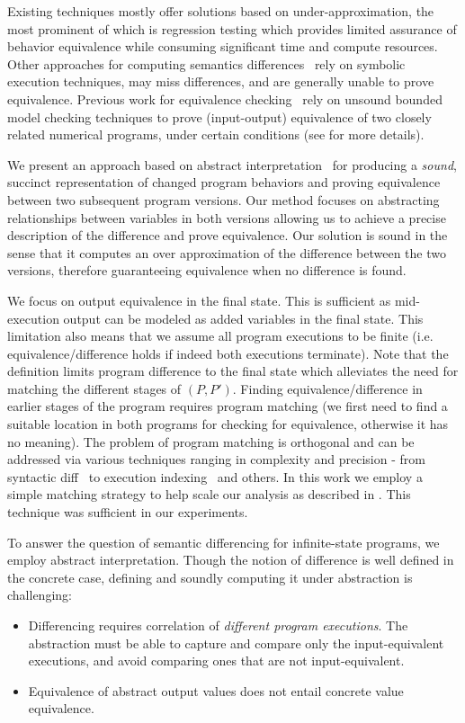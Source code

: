 Existing techniques mostly offer solutions based on  under-approximation, the most prominent of which is regression testing which provides limited assurance of behavior equivalence while consuming significant time and compute resources. 
Other approaches for computing semantics differences~\cite{DwyerElbaumPerson08,EnglerRamos11} rely on symbolic execution techniques, may miss differences, and are generally unable to prove equivalence. Previous work for equivalence checking~\cite{GodlinStrichman09} rely on unsound bounded model checking techniques to prove (input-output) equivalence of two closely related numerical programs, under certain conditions (see  for more details).

We present an approach based on abstract interpretation~\cite{CousotCousot77} for producing a \emph{sound}, succinct representation of changed program behaviors and proving equivalence between two subsequent program versions. Our method focuses on abstracting relationships between variables in both versions allowing us to achieve a precise description of the difference and prove equivalence. Our solution is sound in the sense that it computes an over approximation of the difference between the two versions, therefore guaranteeing equivalence when no difference is found.

We focus on output equivalence in the final state. This is sufficient as mid-execution output can be modeled as added variables in the final state. This limitation also means that we assume all program executions to be finite (i.e. equivalence/difference holds if indeed both executions terminate). Note that the definition limits program difference to the final state which alleviates the need for matching the different stages of $(P,P')$. Finding equivalence/difference in earlier stages of the program requires program matching (we first need to find a suitable location in both programs for checking for equivalence, otherwise it has no meaning). The problem of program matching is orthogonal and can be addressed via various techniques ranging in complexity and precision - from syntactic diff~\cite{} to execution indexing~\cite{} and others. In this work we employ a simple matching strategy to help scale our analysis as described in \secref{}. This technique was sufficient in our experiments.

To answer the question of semantic differencing for infinite-state programs, we employ abstract interpretation. Though the notion of difference is well defined in the concrete case, defining and soundly computing it under abstraction is challenging:
\begin{itemize}
\item Differencing requires correlation of \emph{different program executions}. The abstraction must be able to capture and compare only the input-equivalent executions, and avoid comparing ones that are not input-equivalent.
\item Equivalence of abstract output values does not entail concrete value equivalence.
\end{itemize}

